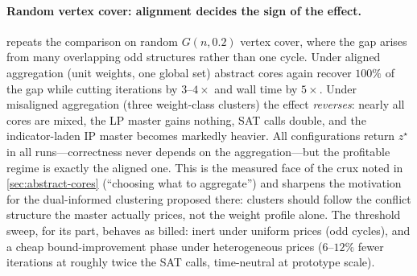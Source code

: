 \paragraph{Random vertex cover: alignment decides the sign of the effect.}
 repeats the comparison on random $G(n, 0.2)$ vertex
cover, where the gap arises from many overlapping odd structures rather
than one cycle. Under aligned aggregation (unit weights, one global set)
abstract cores again recover $100\%$ of the gap while cutting iterations
by $3$--$4\times$ and wall time by $5\times$. Under misaligned aggregation
(three weight-class clusters) the effect \emph{reverses}: nearly all cores
are mixed, the LP master gains nothing, SAT calls double, and the
indicator-laden IP master becomes markedly heavier. All configurations
return $z^\star$ in all runs---correctness never depends on the
aggregation---but the profitable regime is exactly the aligned one. This
is the measured face of the crux noted in \cref{sec:abstract-cores}
(``choosing what to aggregate'') and sharpens the motivation for the
dual-informed clustering proposed there: clusters should follow the
conflict structure the master actually prices, not the weight profile
alone. The threshold sweep, for its part, behaves as billed: inert under
uniform prices (odd cycles), and a cheap bound-improvement phase under
heterogeneous prices ($6$--$12\%$ fewer iterations at roughly twice the
SAT calls, time-neutral at prototype scale).
